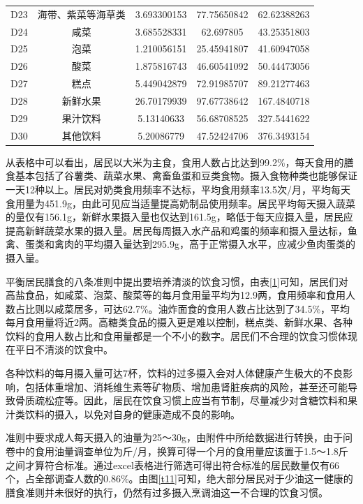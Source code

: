 \documentclass{cumcmthesis}
\begin{document}
\begin{table}[!ht]
{\begin{tabular}{ccccc}
D23  & 海带、紫菜等海草类        & 3.693300153 & 77.75650842 & 62.62388263 \\
D24  & 咸菜               & 3.685528331 & 62.697805   & 43.25351803 \\
D25  & 泡菜               & 1.210056151 & 25.45941807 & 41.60947058 \\
D26  & 酸菜               & 1.875816743 & 46.60541092 & 50.44473056 \\
D27  & 糕点               & 5.449042879 & 72.91985707 & 89.21277463 \\
D28  & 新鲜水果             & 26.70179939 & 97.67738642 & 167.4840718 \\
D29  & 果汁饮料             & 5.13140633  & 56.68708525 & 327.5441622 \\
D30  & 其他饮料             & 5.20086779  & 47.52424706 & 376.3493154 \\ \hline
\end{tabular}}
\end{table}

从表格中可以看出，居民以大米为主食，食用人数占比达到99.2\%，每天食用的膳食基本包括了谷薯类、蔬菜水果、禽畜鱼蛋和豆类食物。摄入食物种类也能够保证一天12种以上。居民对奶类食用频率不达标，平均食用频率13.5次/月，平均每天食用量为451.9g，由此可见应当适量提高奶制品使用频率。居民平均每天摄入蔬菜的量仅有156.1g，新鲜水果摄入量也仅达到161.5g，略低于每天应摄入量，居民应提高新鲜蔬菜水果的摄入量。居民每周摄入水产品和鸡蛋的频率和摄入量达标，鱼禽、蛋类和禽肉的平均摄入量达到295.9g，高于正常摄入水平，应减少鱼肉蛋类的摄入量。

平衡居民膳食的八条准则中提出要培养清淡的饮食习惯，由表\ref{1}可知，居民们对高盐食品，如咸菜、泡菜、酸菜等的每月食用量平均为12.9两，食用频率和食用人数占比则以咸菜居多，可达62.7\%。油炸面食的食用人数占比达到了34.5\%，平均每月食用量将近2两。高糖类食品的摄入更是难以控制，糕点类、新鲜水果、各种饮料的食用人数占比和食用量都是一个不小的数字。居民们不合理的饮食习惯体现在平日不清淡的饮食中。

各种饮料的每月摄入量可达7杯，饮料的过多摄入会对人体健康产生极大的不良影响，包括体重增加、消耗维生素等矿物质、增加患肾脏疾病的风险，甚至还可能导致骨质疏松症等。因此，居民在饮食习惯上应当有节制，尽量减少对含糖饮料和果汁类饮料的摄入，以免对自身的健康造成不良的影响。

 准则中要求成人每天摄入的油量为25～30g，由附件中所给数据进行转换，由于问卷中的食用油量调查单位为斤/月，换算可得一个月的食用量应该置于1.5～1.8斤之间才算符合标准。通过excel表格进行筛选可得出符合标准的居民数量仅有66个，占全部调查人数的0.86\%。由图\ref{t11}可知，绝大部分居民对于少油这一健康的膳食准则并未很好的执行，仍然有过多摄入烹调油这一不合理的饮食习惯。
\end{document}
